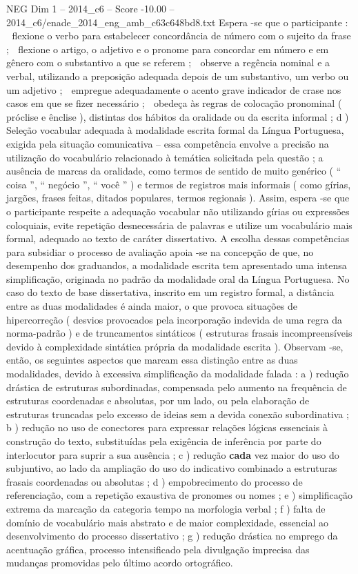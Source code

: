 \begin{textsample}{NEG Dim 1 – 2014\_c6 – Score -10.00 – 2014\_c6/enade\_2014\_eng\_amb\_c63c648bd8.txt}
Espera -se que o participante :  flexione o verbo para estabelecer concordância de número com o sujeito da frase ;  flexione o artigo, o adjetivo e o pronome para concordar em número e em gênero com o substantivo a que se referem ;  observe a regência nominal e a verbal, utilizando a preposição adequada depois de um substantivo, um verbo ou um adjetivo ;  empregue adequadamente o acento grave indicador de crase nos casos em que se fizer necessário ;  obedeça às regras de colocação pronominal ( próclise e ênclise ), distintas dos hábitos da oralidade ou da escrita informal ; d ) Seleção vocabular adequada à modalidade escrita formal da Língua Portuguesa, exigida pela situação comunicativa – essa competência envolve a precisão na utilização do vocabulário relacionado à temática solicitada pela questão ; a ausência de marcas da oralidade, como termos de sentido de muito genérico ( “ coisa ”, “ negócio ”, “ você ” ) e termos de registros mais informais ( como gírias, jargões, frases feitas, ditados populares, termos regionais ).
Assim, espera -se que o participante respeite a adequação vocabular não utilizando gírias ou expressões coloquiais, evite repetição desnecessária de palavras e utilize um vocabulário mais formal, adequado ao texto de caráter dissertativo.
A escolha dessas competências para subsidiar o processo de avaliação apoia -se na concepção de que, no desempenho dos graduandos, a modalidade escrita tem apresentado uma intensa simplificação, originada no padrão da modalidade oral da Língua Portuguesa.
No caso do texto de base dissertativa, inscrito em um registro formal, a distância entre as duas modalidades é ainda maior, o que provoca situações de hipercorreção ( desvios provocados pela incorporação indevida de uma regra da norma-padrão ) e de truncamentos sintáticos ( estruturas frasais incompreensíveis devido à complexidade sintática própria da modalidade escrita ).
Observam -se, então, os seguintes aspectos que marcam essa distinção entre as duas modalidades, devido à excessiva simplificação da modalidade falada : a ) redução drástica de estruturas subordinadas, compensada pelo aumento na frequência de estruturas coordenadas e absolutas, por um lado, ou pela elaboração de estruturas truncadas pelo excesso de ideias sem a devida conexão subordinativa ; b ) redução no uso de conectores para expressar relações lógicas essenciais à construção do texto, substituídas pela exigência de inferência por parte do interlocutor para suprir a sua ausência ; c ) redução \textbf{cada} vez maior do uso do subjuntivo, ao lado da ampliação do uso do indicativo combinado a estruturas frasais coordenadas ou absolutas ; d ) empobrecimento do processo de referenciação, com a repetição exaustiva de pronomes ou nomes ; e ) simplificação extrema da marcação da categoria tempo na morfologia verbal ; f ) falta de domínio de vocabulário mais abstrato e de maior complexidade, essencial ao desenvolvimento do processo dissertativo ; g ) redução drástica no emprego da acentuação gráfica, processo intensificado pela divulgação imprecisa das mudanças promovidas pelo último acordo ortográfico.

\end{textsample}

